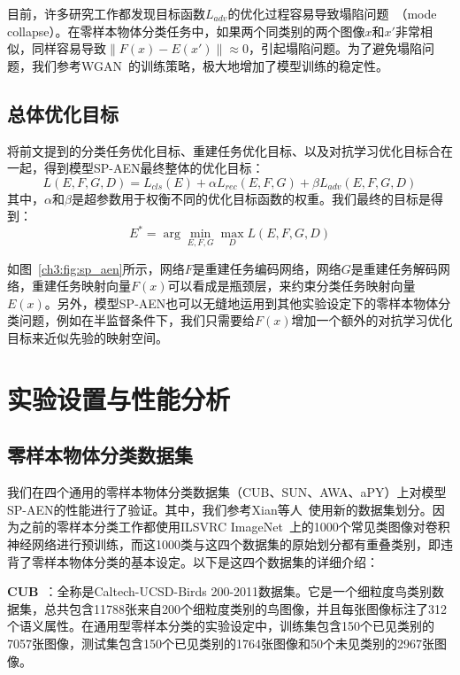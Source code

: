 目前，许多研究工作都发现目标函数$L_{adv}$的优化过程容易导致塌陷问题~\cite{arjovsky2017wasserstein}（mode collapse）。在零样本物体分类任务中，如果两个同类别的两个图像$x$和$x'$非常相似，同样容易导致$\|F(x)-E(x')\|\approx 0$，引起塌陷问题。为了避免塌陷问题，我们参考WGAN~\cite{arjovsky2017wasserstein}的训练策略，极大地增加了模型训练的稳定性。


\subsection{总体优化目标}
将前文提到的分类任务优化目标、重建任务优化目标、以及对抗学习优化目标合在一起，得到模型SP-AEN最终整体的优化目标：
\begin{equation} \label{ch3:eq:eq_5}
L (E, F, G, D) = L_{cls}(E) + \alpha L_{rec} (E, F, G) + \beta L_{adv}(E, F, G, D)
\end{equation}
其中，$\alpha$和$\beta$是超参数用于权衡不同的优化目标函数的权重。我们最终的目标是得到：
\begin{equation}\label{ch3:eq:eq_6}
E^* = \arg\min\limits_{E, F, G}\max\limits_{D} L(E, F, G, D)
\end{equation}

如图~\ref{ch3:fig:sp_aen}所示，网络$F$是重建任务编码网络，网络$G$是重建任务解码网络，重建任务映射向量$F(x)$可以看成是瓶颈层，来约束分类任务映射向量$E(x)$。另外，模型SP-AEN也可以无缝地运用到其他实验设定下的零样本物体分类问题，例如在半监督条件下，我们只需要给$F(x)$增加一个额外的对抗学习优化目标来近似先验的映射空间。


\section{实验设置与性能分析}
\subsection{零样本物体分类数据集}

我们在四个通用的零样本物体分类数据集（CUB、SUN、AWA、aPY）上对模型SP-AEN的性能进行了验证。其中，我们参考Xian等人~\cite{xian2017zero}使用新的数据集划分。因为之前的零样本分类工作都使用ILSVRC ImageNet~\cite{russakovsky2015imagenet}上的1000个常见类图像对卷积神经网络进行预训练，而这1000类与这四个数据集的原始划分都有重叠类别，即违背了零样本物体分类的基本设定。以下是这四个数据集的详细介绍：

\textbf{CUB}~\cite{wah2011caltech}：全称是Caltech-UCSD-Birds 200-2011数据集。它是一个细粒度鸟类别数据集，总共包含11788张来自200个细粒度类别的鸟图像，并且每张图像标注了312个语义属性。在通用型零样本分类的实验设定中，训练集包含150个已见类别的7057张图像，测试集包含150个已见类别的1764张图像和50个未见类别的2967张图像。

